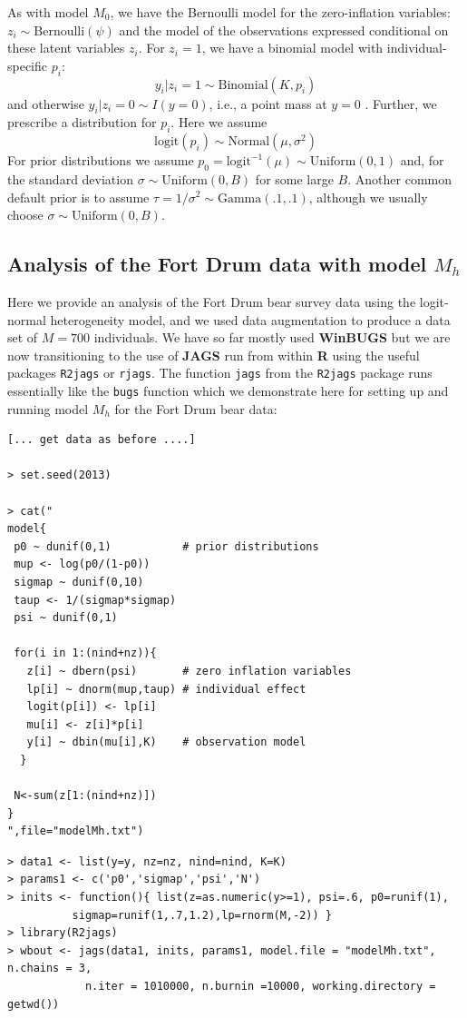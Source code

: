 As with model $M_{0}$, we have the Bernoulli model for the
zero-inflation variables: $z_{i} \sim \mbox{Bernoulli}(\psi)$ and the model
of the observations expressed conditional on these latent variables
$z_{i}$. For $z_{i}=1$, we have a binomial model with
individual-specific $p_{i}$:
\[
y_{i}|{z_{i} \! = \! 1} \sim \mbox{Binomial}(K,p_{i})
\]
and otherwise $y_{i} |{ z_{i} \! = \! 0} \sim I(y=0)$, i.e., a point
mass at $y=0$ . Further, we
prescribe a distribution for $p_{i}$. Here we assume
\[
\mathrm{logit}(p_{i}) \sim \mbox{Normal}(\mu,\sigma^2)
\]
For prior distributions we assume
$p_{0} = \mbox{logit}^{-1}(\mu) \sim
\mbox{Uniform}(0,1)$ and, for the standard deviation
$\sigma \sim \mbox{Uniform}(0,B)$ for some large $B$.
Another common default prior is to assume
$\tau = 1/\sigma^{2} \sim \mbox{Gamma}(.1,.1)$, although we usually
choose  $\sigma \sim \mbox{Uniform}(0,B)$.



\subsection{Analysis of the Fort Drum data with model $M_{h}$}
\label{closed.sec.Mhbear}

Here we provide an analysis of the Fort Drum bear survey data using
the
 logit-normal heterogeneity model, and we
used data augmentation to produce a data
set of $M=700$ individuals.
We have so far mostly used {\bf WinBUGS} but we are now transitioning
to the use of {\bf JAGS} run from within {\bf R} using the useful
packages \mbox{\tt R2jags} or \mbox{\tt rjags}.  The function
\mbox{\tt jags} from the \mbox{\tt R2jags} package runs essentially
like the \mbox{\tt bugs} function which we demonstrate here for
setting up and running model $M_{h}$ for the Fort Drum bear data:
{\small
\begin{verbatim}
[... get data as before ....]

> set.seed(2013)

> cat("
model{
 p0 ~ dunif(0,1)           # prior distributions
 mup <- log(p0/(1-p0))
 sigmap ~ dunif(0,10)
 taup <- 1/(sigmap*sigmap)
 psi ~ dunif(0,1)

 for(i in 1:(nind+nz)){
   z[i] ~ dbern(psi)       # zero inflation variables
   lp[i] ~ dnorm(mup,taup) # individual effect
   logit(p[i]) <- lp[i]
   mu[i] <- z[i]*p[i]
   y[i] ~ dbin(mu[i],K)    # observation model
  }

 N<-sum(z[1:(nind+nz)])
}
",file="modelMh.txt")
\end{verbatim}
}
{\small
\begin{verbatim}
> data1 <- list(y=y, nz=nz, nind=nind, K=K)
> params1 <- c('p0','sigmap','psi','N')
> inits <- function(){ list(z=as.numeric(y>=1), psi=.6, p0=runif(1),
          sigmap=runif(1,.7,1.2),lp=rnorm(M,-2)) }
> library(R2jags)
> wbout <- jags(data1, inits, params1, model.file = "modelMh.txt", n.chains = 3,
            n.iter = 1010000, n.burnin =10000, working.directory = getwd())
\end{verbatim}
}

